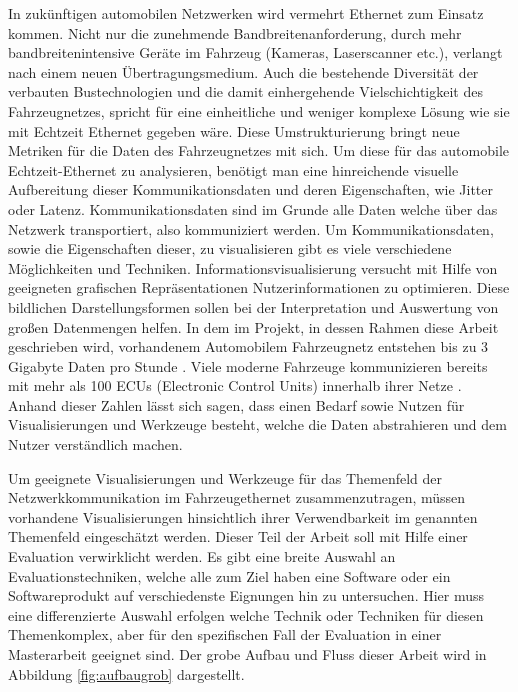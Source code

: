 \documentclass[draft=false
              ,paper=a4
              ,twoside=false
              ,fontsize=11pt
              ,headsepline
              ,BCOR10mm
              ,DIV11
              ]{scrbook}
\newcommand{\TODO}[1]{\colorbox{yellow}{\textcolor{red}{[TODO: #1]}}}
\begin{document}
In zukünftigen automobilen Netzwerken wird vermehrt Ethernet zum Einsatz kommen. Nicht nur die zunehmende Bandbreitenanforderung, durch mehr bandbreitenintensive Geräte im Fahrzeug (Kameras, Laserscanner etc.), verlangt nach einem neuen Übertragungsmedium. Auch die bestehende Diversität der verbauten Bustechnologien und die damit einhergehende Vielschichtigkeit des Fahrzeugnetzes, spricht für eine einheitliche und weniger komplexe Lösung wie sie mit Echtzeit Ethernet gegeben wäre. Diese Umstrukturierung bringt neue Metriken für die Daten des Fahrzeugnetzes mit sich. Um diese für das automobile Echtzeit-Ethernet zu analysieren, benötigt man eine hinreichende visuelle Aufbereitung dieser Kommunikationsdaten und deren Eigenschaften, wie Jitter oder Latenz. Kommunikationsdaten sind im Grunde alle Daten welche über das Netzwerk transportiert, also kommuniziert werden. Um Kommunikationsdaten, sowie die Eigenschaften dieser, zu visualisieren gibt es viele verschiedene Möglichkeiten und Techniken. Informationsvisualisierung versucht mit Hilfe von geeigneten grafischen Repräsentationen Nutzerinformationen zu optimieren. Diese bildlichen Darstellungsformen sollen bei der Interpretation und Auswertung von großen Datenmengen helfen. In dem im Projekt, in dessen Rahmen diese Arbeit geschrieben wird, vorhandenem Automobilem Fahrzeugnetz entstehen bis zu 3 Gigabyte Daten pro Stunde \cite{core_2017}. Viele moderne Fahrzeuge kommunizieren bereits mit mehr als 100 ECUs (Electronic Control Units) innerhalb ihrer Netze \cite{broy_cross-layer_2011}. Anhand dieser Zahlen lässt sich sagen, dass einen Bedarf sowie Nutzen für Visualisierungen und Werkzeuge besteht, welche die Daten abstrahieren und dem Nutzer verständlich machen.

%
Um geeignete Visualisierungen und Werkzeuge für das Themenfeld der Netzwerkkommunikation im Fahrzeugethernet zusammenzutragen, müssen vorhandene Visualisierungen hinsichtlich ihrer Verwendbarkeit im genannten Themenfeld eingeschätzt werden. Dieser Teil der Arbeit soll mit Hilfe einer Evaluation verwirklicht werden. Es gibt eine breite Auswahl an Evaluationstechniken, welche alle zum Ziel haben eine Software oder ein Softwareprodukt auf verschiedenste Eignungen hin zu untersuchen. Hier muss eine differenzierte Auswahl erfolgen welche Technik oder Techniken für diesen Themenkomplex, aber für den spezifischen Fall der Evaluation in einer Masterarbeit geeignet sind. Der grobe Aufbau und Fluss dieser Arbeit wird in Abbildung \ref{fig:aufbaugrob} dargestellt. 
\end{document}
